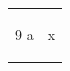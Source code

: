 \documentclass{article}
\begin{document}
\begin{tabular}{p{4cm}l}
\begin{thebibliography}{9}\bibitem{k} a\end{thebibliography} & x \\
\end{tabular}
\end{document}
